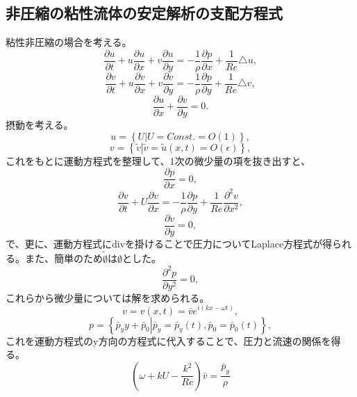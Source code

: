 \subsection{非圧縮の粘性流体の安定解析の支配方程式}
粘性非圧縮の場合を考える。
\begin{equation}
 \frac{\partial u}{\partial t} 
  + u\frac{\partial u}{\partial x}
  + v\frac{\partial u}{\partial y}
  = -\frac{1}{\rho}\frac{\partial p}{\partial x}
  + \frac{1}{Re}\triangle u,
\end{equation}
\begin{equation}
 \frac{\partial v}{\partial t} 
  + u\frac{\partial v}{\partial x}
  + v\frac{\partial v}{\partial y}
  = -\frac{1}{\rho}\frac{\partial p}{\partial y}
  + \frac{1}{Re}\triangle v,
\end{equation}
\begin{equation}
 \frac{\partial u}{\partial x}
  + \frac{\partial v}{\partial y}
  = 0.
\end{equation}
摂動を考える。
\begin{equation}
 u=\left\{\left.U\right|U=Const.=O(1)\right\},
\end{equation}
\begin{equation}
 v=\left\{\left.\tilde{v}\right|\tilde{v}=\tilde{u}(x,t)=O(\epsilon)\right\},
\end{equation}
これをもとに運動方程式を整理して、1次の微少量の項を抜き出すと、
\begin{equation}
 \frac{\partial p}{\partial x} = 0,
\end{equation}
\begin{equation}
 \frac{\partial v}{\partial t} 
  + U\frac{\partial v}{\partial x}
  = -\frac{1}{\rho}\frac{\partial p}{\partial y}
  + \frac{1}{Re}\frac{\partial^2v}{\partial x^2},
\end{equation}
\begin{equation}
 \frac{\partial v}{\partial y} = 0,
\end{equation}
で、更に、運動方程式にdivを掛けることで圧力についてLaplace方程式が得られ
る。また、簡単のため$\tilde{\emptyset}$は$\emptyset$とした。
\begin{equation}
 \frac{\partial^2p}{\partial y^2}=0,
\end{equation}
これらから微少量については解を求められる。
\begin{equation}
 v=v(x,t)=\bar{v}e^{i(kx-\omega t)},
\end{equation}
\begin{equation}
 p=\left\{\left.\bar{p}_yy+\bar{p}_0\right|\bar{p}_y=\bar{p}_y(t),\bar{p}_0=\bar{p}_0(t)\right\},
\end{equation}
これを運動方程式のy方向の方程式に代入することで、圧力と流速の関係を得る。
\begin{equation}
 \left(\omega+kU-\frac{k^2}{Re}\right)\bar{v} = \frac{\bar{p}_y}{\rho}
\end{equation}
